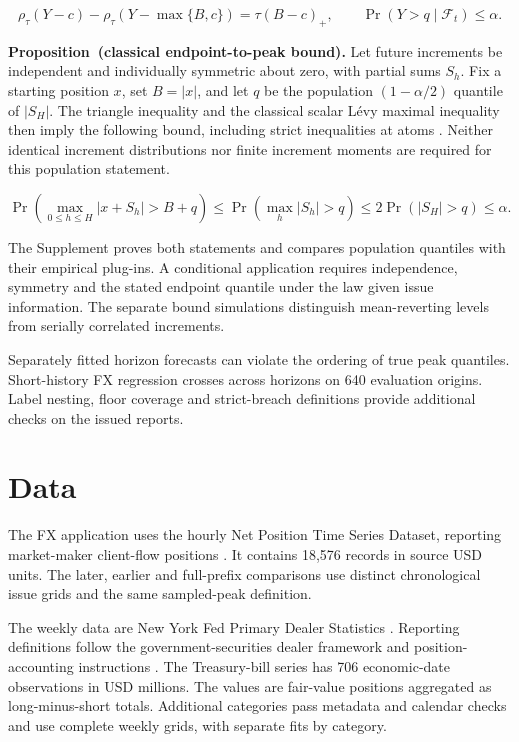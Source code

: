 \documentclass[11pt,a4paper]{article}
\newcounter{proposition}
\begin{document}
\[
\rho_\tau(Y-c)-\rho_\tau(Y-\max\{B,c\})=\tau(B-c)_+,\qquad \Pr(Y>q\mid\mathcal F_t)\le\alpha.
\]

\noindent\textbf{Proposition~\theproposition (classical endpoint-to-peak bound).}\label{prop:levy} Let future increments be independent and individually symmetric about zero, with partial sums \(S_h\). Fix a starting position \(x\), set \(B=|x|\), and let \(q\) be the population \((1-\alpha/2)\) quantile of \(|S_H|\). The triangle inequality and the classical scalar L\'evy maximal inequality then imply the following bound, including strict inequalities at atoms \citep{sussman2023}. Neither identical increment distributions nor finite increment moments are required for this population statement.


\[
\Pr\!\left(\max_{0\le h\le H}|x+S_h|>B+q\right)\le\Pr\!\left(\max_h|S_h|>q\right)\le2\Pr(|S_H|>q)\le\alpha.
\]

The Supplement proves both statements and compares population quantiles with their empirical plug-ins. A conditional application requires independence, symmetry and the stated endpoint quantile under the law given issue information. The separate bound simulations distinguish mean-reverting levels from serially correlated increments.


Separately fitted horizon forecasts can violate the ordering of true peak quantiles. Short-history FX regression crosses across horizons on 640 evaluation origins. Label nesting, floor coverage and strict-breach definitions provide additional checks on the issued reports.


\FloatBarrier

\section{Data}\label{sec:data}

The FX application uses the hourly Net Position Time Series Dataset, reporting market-maker client-flow positions \citep{dataset,wisniewski2020}. It contains 18,576 records in source USD units. The later, earlier and full-prefix comparisons use distinct chronological issue grids and the same sampled-peak definition.

The weekly data are New York Fed Primary Dealer Statistics \citep{nyfeddata}. Reporting definitions follow the government-securities dealer framework and position-accounting instructions \citep{fr2004_2013,fr2004_2024}. The Treasury-bill series has 706 economic-date observations in USD millions. The values are fair-value positions aggregated as long-minus-short totals. Additional categories pass metadata and calendar checks and use complete weekly grids, with separate fits by category.
\end{document}
